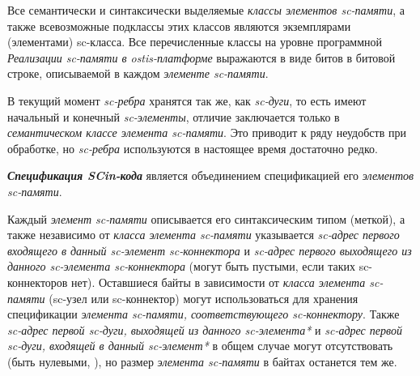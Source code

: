 Все семантически и синтаксически выделяемые \textit{классы элементов sc-памяти\scnsupergroupsign}, а также всевозможные подклассы этих классов являются экземплярами (элементами) sc-класса. Все перечисленные классы на уровне программной \textit{Реализации sc-памяти в ostis-платформе} выражаются в виде битов в битовой строке, описываемой в каждом \textit{элементе sc-памяти}.

В текущий момент \textit{sc-ребра} хранятся так же, как \textit{sc-дуги}, то есть имеют начальный и конечный \textit{sc-элементы}, отличие заключается только в \textit{семантическом классе элемента sc-памяти\scnsupergroupsign}. Это приводит к ряду неудобств при обработке, но \textit{sc-ребра} используются в настоящее время достаточно редко.

\textbf{\textit{Спецификация SCin-кода}} является объединением спецификацией его \textit{элементов sc-памяти}.

\begin{SCn}
\begin{scnindent}
\end{scnindent}
\end{SCn}

Каждый \textit{элемент sc-памяти} описывается его синтаксическим типом (меткой), а также независимо от \textit{класса элемента sc-памяти\scnsupergroupsign} указывается \textit{sc-адрес первого входящего в данный sc-элемент sc-коннектора} и \textit{sc-адрес первого выходящего из данного sc-элемента sc-коннектора} (могут быть пустыми, если таких sc-коннекторов нет). Оставшиеся байты в зависимости от \textit{класса элемента sc-памяти} (sc-узел или sc-коннектор) могут использоваться для хранения спецификации \textit{элемента sc-памяти, соответствующего sc-коннектору}. Также \textit{sc-адрес первой sc-дуги, выходящей из данного sc-элемента*} и \textit{sc-адрес первой sc-дуги, входящей в данный sc-элемент*} в общем случае могут отсутствовать (быть нулевыми, ), но размер \textit{элемента sc-памяти} в байтах останется тем же.

